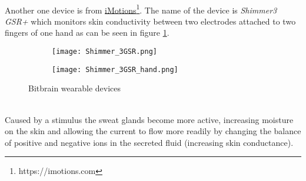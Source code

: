 \\ \indent
Another one device is from \href{https://imotions.com}{iMotions}\footnote{https://imotions.com}. The name of the device is \textit{Shimmer3 GSR+} which monitors skin conductivity between two electrodes attached to two fingers of one hand as can be seen in figure \ref{fig:shimmer3}.
\begin{figure}[h]
    \centering
    \begin{subfigure}{{0.45\textwidth}}
    		\texttt{[image: Shimmer\_3GSR.png]}
    \end{subfigure}
    \begin{subfigure}{0.45\textwidth}
    		\texttt{[image: Shimmer\_3GSR\_hand.png]} 
    \end{subfigure}
    \caption{Bitbrain wearable devices}
    \label{fig:shimmer3}
\end{figure}
\\
Caused by a stimulus the sweat glands become more active, increasing moisture on the skin and allowing the current to flow more readily by changing the balance of positive and negative ions in the secreted fluid (increasing skin conductance).

